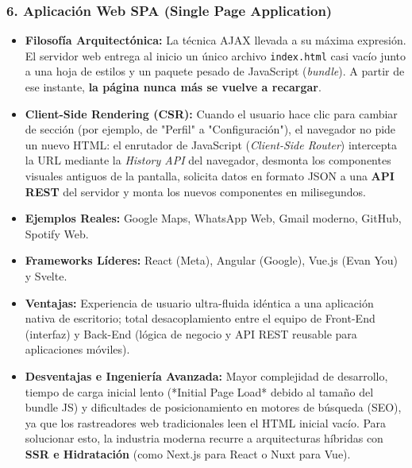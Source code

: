 \subsubsection{6. Aplicación Web SPA (Single Page Application)}
\begin{itemize}[leftmargin=1.2cm]
  \item \textbf{Filosofía Arquitectónica:} La técnica AJAX llevada a su máxima expresión. El servidor web entrega al inicio un único archivo \texttt{index.html} casi vacío junto a una hoja de estilos y un paquete pesado de JavaScript (\textit{bundle}). A partir de ese instante, \textbf{la página nunca más se vuelve a recargar}.
  \item \textbf{Client-Side Rendering (CSR):} Cuando el usuario hace clic para cambiar de sección (por ejemplo, de "Perfil" a "Configuración"), el navegador no pide un nuevo HTML: el enrutador de JavaScript (\textit{Client-Side Router}) intercepta la URL mediante la \textit{History API} del navegador, desmonta los componentes visuales antiguos de la pantalla, solicita datos en formato JSON a una \textbf{API REST} del servidor y monta los nuevos componentes en milisegundos.
  \item \textbf{Ejemplos Reales:} Google Maps, WhatsApp Web, Gmail moderno, GitHub, Spotify Web.
  \item \textbf{Frameworks Líderes:} React (Meta), Angular (Google), Vue.js (Evan You) y Svelte.
  \item \textbf{Ventajas:} Experiencia de usuario ultra-fluida idéntica a una aplicación nativa de escritorio; total desacoplamiento entre el equipo de Front-End (interfaz) y Back-End (lógica de negocio y API REST reusable para aplicaciones móviles).
  \item \textbf{Desventajas e Ingeniería Avanzada:} Mayor complejidad de desarrollo, tiempo de carga inicial lento (*Initial Page Load* debido al tamaño del bundle JS) y dificultades de posicionamiento en motores de búsqueda (SEO), ya que los rastreadores web tradicionales leen el HTML inicial vacío. Para solucionar esto, la industria moderna recurre a arquitecturas híbridas con \textbf{SSR e Hidratación} (como Next.js para React o Nuxt para Vue).
\end{itemize}

